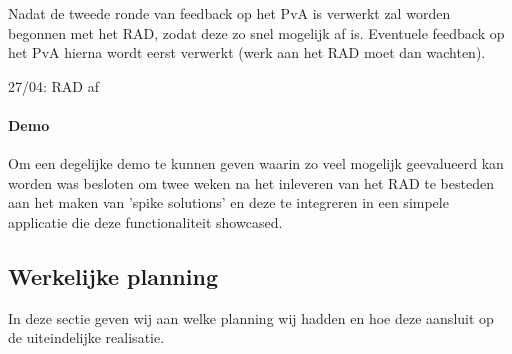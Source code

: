 Nadat de tweede ronde van feedback op het PvA is verwerkt zal worden begonnen
met het RAD, zodat deze zo snel mogelijk af is. Eventuele feedback op het PvA
hierna wordt eerst verwerkt (werk aan het RAD moet dan wachten).

27/04: RAD af

\paragraph{Demo}

Om een degelijke demo te kunnen geven waarin zo veel mogelijk geevalueerd kan
worden was besloten om twee weken na het inleveren van het RAD te besteden aan
het maken van 'spike solutions' en deze te integreren in een simpele applicatie
die deze functionaliteit showcased.

\subsection{Werkelijke planning}
\label{werkelijke_planning}

In deze sectie geven wij aan welke planning wij hadden en hoe deze aansluit op
de uiteindelijke realisatie.

